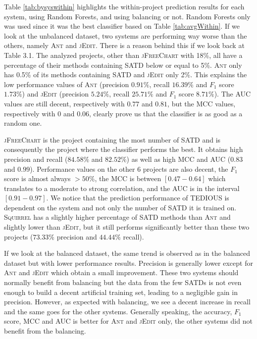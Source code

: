 Table \ref{tab:bysyswithin} highlights the within-project prediction results for each system, using Random Forests, and using balancing or not. Random Forests only was used since it was the best classifier based on Table \ref{tab:avgWithin}. If we look at the unbalanced dataset, two systems are performing way worse than the others, namely \textsc{Ant} and \textsc{jEdit}. There is a reason behind this if we look back at Table 3.1. The analyzed projects, other than \textsc{jFreeChart} with 18\%, all have a percentage of their methods containing SATD below or equal to 5\%. \textsc{Ant} only has 0.5\% of its methods containing SATD and \textsc{jEdit} only 2\%. This explains the low performance values of \textsc{Ant} (precision $0.91\%$, recall $16.39\%$ and $F_1$ score $1.73\%$) and \textsc{jEdit} (precision $5.24\%$, recall $25.71\%$ and $F_1$ score $8.71\%$). The AUC values are still decent, respectively with $0.77$ and $0.81$, but the MCC values, respectively with $0$ and $0.06$, clearly prove us that the classifier is as good as a random one.

\textsc{jFreeChart} is the project containing the most number of SATD and is consequently the project where the classifier performs the best. It obtains high precision and recall ($84.58\%$ and  $82.52\%$) as well as high MCC and AUC ($0.83$ and $0.99$). Performance values on the other 6 projects are also decent, the $F_1$ score is almost always $>50\%$, the MCC is between $[0.47-0.64]$ which translates to a moderate to strong correlation, and the AUC is in the interval $[0.91-0.97]$. We notice that the prediction performance of TEDIOUS is dependent on the system and not only the number of SATD it is trained on. \textsc{Squirrel} has a slightly higher percentage of SATD methods than \textsc{Ant} and slightly lower than \textsc{jEdit}, but it still performs significantly better than these two projects ($73.33\%$ precision and $44.44\%$ recall). 

If we look at the balanced dataset, the same trend is observed as in the balanced dataset but with lower performance results. Precision is generally lower except for \textsc{Ant} and \textsc{jEdit} which obtain a small improvement. These two systems should normally benefit from balancing but the data from the few SATDs is not even enough to build a decent artificial training set, leading to a negligible gain in precision. However, as expected with balancing, we see a decent increase in recall and the same goes for the other systems. Generally speaking, the accuracy, $F_1$ score, MCC and AUC is better for \textsc{Ant} and \textsc{jEdit} only, the other systems did not benefit from the balancing.

